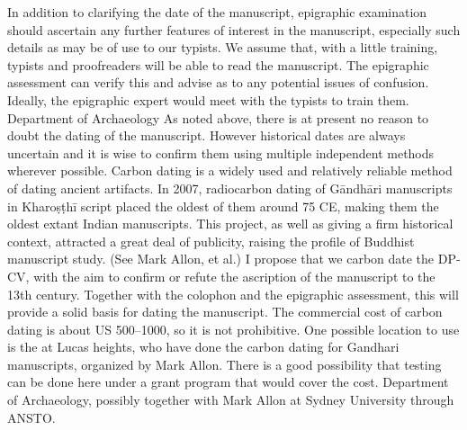 {}In addition to clarifying the date of the manuscript, epigraphic examination should ascertain any further features of interest in the manuscript, especially such details as may be of use to our typists. We assume that, with a little training, typists and proofreaders will be able to read the manuscript. The epigraphic assessment can verify this and advise as to any potential issues of confusion. Ideally, the epigraphic expert would meet with the typists to train them.\markdownRendererInterblockSeparator
{}\markdownRendererBlockQuoteBegin
{} Department of Archaeology
\markdownRendererBlockQuoteEnd \markdownRendererInterblockSeparator
{}\markdownRendererInterblockSeparator
{}As noted above, there is at present no reason to doubt the dating of the manuscript. However historical dates are always uncertain and it is wise to confirm them using multiple independent methods wherever possible. Carbon dating is a widely used and relatively reliable method of dating ancient artifacts.\markdownRendererInterblockSeparator
{}In 2007, radiocarbon dating of Gāndhāri manuscripts in Kharoṣṭhī script placed the oldest of them around 75 CE, making them the oldest extant Indian manuscripts. This project, as well as giving a firm historical context, attracted a great deal of publicity, raising the profile of Buddhist manuscript study. (See Mark Allon, et al.)\markdownRendererInterblockSeparator
{}I propose that we carbon date the DP-CV, with the aim to confirm or refute the ascription of the manuscript to the 13th century. Together with the colophon and the epigraphic assessment, this will provide a solid basis for dating the manuscript.\markdownRendererInterblockSeparator
{}The commercial cost of carbon dating is about US \markdownRendererDollarSign{}500–\markdownRendererDollarSign{}1000, so it is not prohibitive. One possible location to use is the  at Lucas heights, who have done the carbon dating for Gandhari manuscripts, organized by Mark Allon. There is a good possibility that testing can be done here under a grant program that would cover the cost.\markdownRendererInterblockSeparator
{}\markdownRendererBlockQuoteBegin
{} Department of Archaeology, possibly together with Mark Allon at Sydney University through ANSTO.
